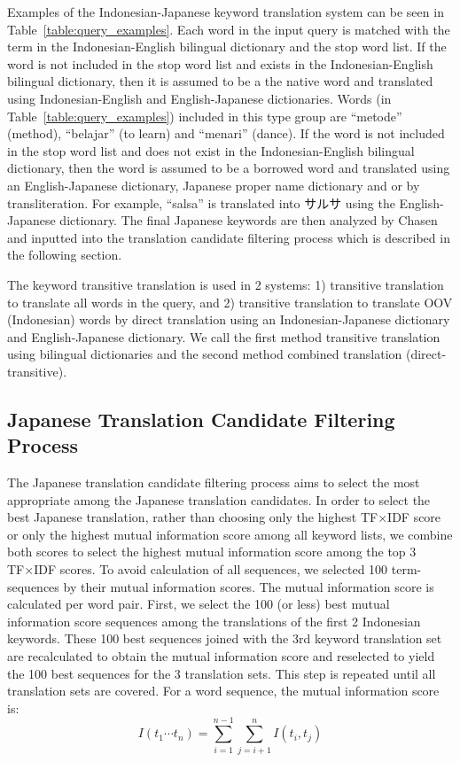 \documentclass[english]{jnlp_1.3c}
\begin{document}
Examples of the Indonesian-Japanese keyword translation system can be
seen in Table~\ref{table:query_examples}. Each word in the input query
is matched with the term in the Indonesian-English bilingual dictionary
and the stop word list. If the word is not included in the stop word
list and exists in the Indonesian-English bilingual dictionary, then it
is assumed to be a the native word and translated using
Indonesian-English and English-Japanese dictionaries. Words (in
Table~\ref{table:query_examples}) included in this type group are ``metode''
(method), ``belajar'' (to learn) and ``menari'' (dance). If the word is not
included in the stop word list and does not exist in the
Indonesian-English bilingual dictionary, then the word is assumed to be
a borrowed word and translated using an English-Japanese dictionary,
Japanese proper name dictionary and or by transliteration. For example,
``salsa'' is translated into サルサ using the English-Japanese
dictionary. The final Japanese keywords are then analyzed by Chasen and
inputted into the translation candidate filtering process which is
described in the following section.  

The keyword transitive translation
is used in 2 systems: 1) transitive translation to translate all words
in the query, and 2) transitive translation to translate OOV
(Indonesian) words by direct translation using an Indonesian-Japanese
dictionary and English-Japanese dictionary. We call the first method
transitive translation using bilingual dictionaries and the second
method combined translation (direct-transitive).

\subsection{Japanese Translation Candidate Filtering Process}
\label{Japanese Translation Candidate Filtering Process} The Japanese
translation candidate filtering process aims to select the most
appropriate among the Japanese translation candidates. In order to
select the best Japanese translation, rather than choosing only the
highest TF×IDF score or only the highest mutual information score among
all keyword lists, we combine both scores to select the highest mutual
information score among the top 3 TF×IDF scores. To avoid calculation
of all sequences, we selected 100 term-sequences by their mutual
information scores. The mutual information score is calculated per word
pair. First, we select the 100 (or less) best mutual information score
sequences among the translations of the first 2 Indonesian
keywords. These 100 best sequences joined with the 3rd keyword
translation set are recalculated to obtain the mutual information score
and reselected to yield the 100 best sequences for the 3 translation
sets. This step is repeated until all translation sets are covered.  For
a word sequence, the mutual information score is:
\begin{equation}
  I(t_1 \cdots t_n) = \sum^{n-1}_{i=1}\sum^{n}_{j=i+1}I(t_i,t_j)
    \label{eq1}
\end{equation}
\end{document}
